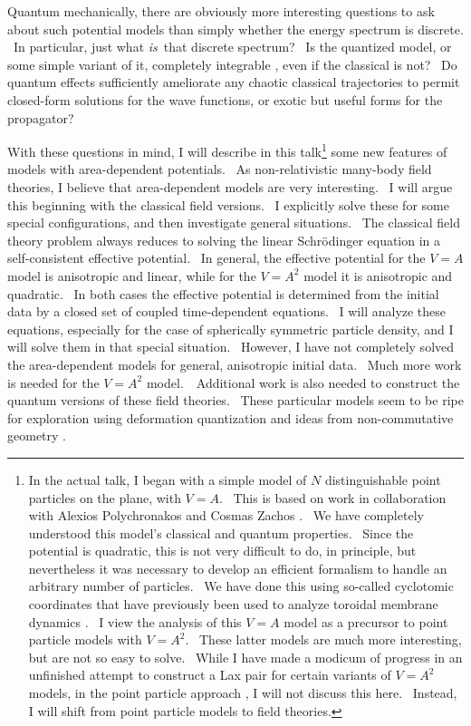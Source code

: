 \documentclass[a4paper,12pt]{article}%
\begin{document}
Quantum mechanically, there are obviously more interesting questions to ask
about such potential models than simply whether the energy spectrum is
discrete. \ In particular, just what \emph{is}\ that discrete spectrum? \ Is
the quantized model, or some simple variant of it, completely integrable
\cite{Jaffe}, even if the classical is not? \ Do quantum effects sufficiently
ameliorate any chaotic classical trajectories \cite{Gutzwiller} to permit
closed-form solutions for the wave functions, or exotic but useful forms
\cite{Cataplex} for the propagator?

With these questions in mind, I will describe in this talk\footnote{In the
actual talk, I began with a simple model of $N$ distinguishable point
particles on the plane, with $V=A$. \ This is based on work in collaboration
with Alexios Polychronakos and Cosmas Zachos \cite{CPZ}. \ We have completely
understood this model's classical and quantum properties. \ Since the
potential is quadratic, this is not very difficult to do, in principle, but
nevertheless it was necessary to develop an efficient formalism to handle an
arbitrary number of particles. \ We have done this using so-called cyclotomic
coordinates that have previously been used to analyze toroidal membrane
dynamics \cite{FZ}. \ I view the analysis of this $V=A$ model as a precursor
to point particle models with $V=A^{2}$. \ These latter models are much more
interesting, but are not so easy to solve. \ While I have made a modicum of
progress in an unfinished attempt to construct a Lax pair for certain variants
of $V=A^{2}$ models, in the point particle approach \cite{Perelomov}, I will
not discuss this here. \ Instead, I will shift from point particle models to
field theories.} some new features of models with area-dependent potentials.
\ As non-relativistic many-body field theories, I believe that area-dependent
models are very interesting. \ I will argue this beginning with the classical
field versions. \ I explicitly solve these for some special configurations,
and then investigate general situations. \ The classical field theory problem
always reduces to solving the linear Schr\"{o}dinger equation in a
self-consistent effective potential. \ In general, the effective potential for
the $V=A$ model is anisotropic and linear, while for the $V=A^{2}$ model it is
anisotropic and quadratic. \ In both cases the effective potential is
determined from the initial data by a closed set of coupled time-dependent
equations. \ I will analyze these equations, especially for the case of
spherically symmetric particle density, and I will solve them in that special
situation. \ However, I have not completely solved the area-dependent models
for general, anisotropic initial data. \ Much more work is needed for the
$V=A^{2}$ model.\ \ Additional work is also needed to construct the quantum
versions of these field theories. \ These particular models seem to be ripe
for exploration using deformation quantization \cite{Bayen,CFZ,CUZ} and ideas
from non-commutative geometry \cite{Gracia}.
\end{document}

